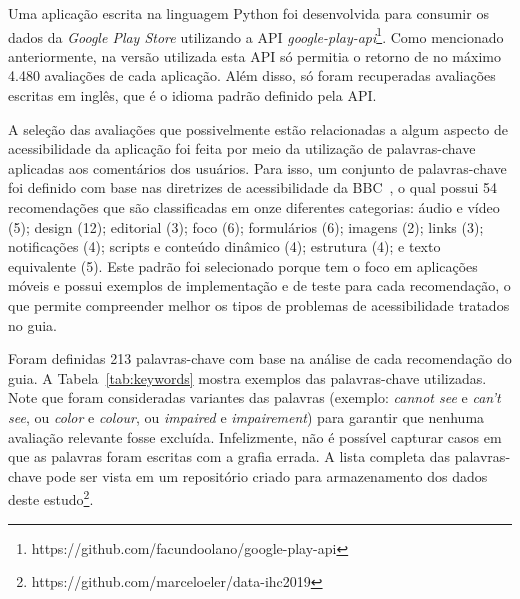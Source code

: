 Uma aplicação escrita na linguagem Python foi desenvolvida para consumir os dados da \textit{Google Play Store} utilizando a API \emph{google-play-api}\footnote{https://github.com/facundoolano/google-play-api}. Como mencionado anteriormente, na versão utilizada esta API só permitia o retorno de no máximo 4.480 avaliações de cada aplicação. Além disso, só foram recuperadas avaliações escritas em inglês, que é o idioma padrão definido pela API.


A seleção das avaliações que possivelmente estão relacionadas a algum aspecto de acessibilidade da aplicação foi feita por meio da utilização de palavras-chave aplicadas aos comentários dos usuários.
Para isso, um conjunto de palavras-chave foi definido com base nas diretrizes de acessibilidade da BBC~\cite{bbc}, o qual possui 54 recomendações que são classificadas em onze diferentes categorias: áudio e vídeo (5); design (12); editorial (3); foco (6); formulários (6); imagens (2); links (3); notificações (4); scripts e conteúdo dinâmico (4); estrutura (4); e texto equivalente (5). 
Este padrão foi selecionado porque tem o foco em aplicações móveis e possui exemplos de implementação e de teste para cada recomendação, o que permite compreender melhor os tipos de problemas de acessibilidade tratados no guia. 

Foram definidas 213 palavras-chave com base na análise de cada recomendação do guia. 
A Tabela~\ref{tab:keywords} mostra exemplos das palavras-chave utilizadas.
Note que foram consideradas variantes das palavras (exemplo: \textit{cannot see} e \textit{can't see}, ou \textit{color} e \textit{colour}, ou \textit{impaired} e \textit{impairement}) para garantir que nenhuma avaliação relevante fosse excluída. Infelizmente, não é possível capturar casos em que as palavras foram escritas com a grafia errada. A lista completa das palavras-chave pode ser vista em um repositório criado para armazenamento dos dados deste estudo\footnote{https://github.com/marceloeler/data-ihc2019}.


